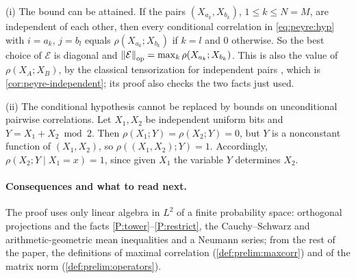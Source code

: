 \begin{remark}\label{rem:peyre:sharp}
(i) The bound can be attained. If the pairs $(X_{a_k},X_{b_k})$,
$1\le k\le N=M$, are independent of each other, then every conditional
correlation in \eqref{eq:peyre:hyp} with $i=a_k$, $j=b_l$ equals
$\rho(X_{a_k};X_{b_k})$ if $k=l$ and $0$ otherwise. So the best choice of
$\mathcal E$ is diagonal and $\left\|\mathcal E\right\|_{\mathrm{op}}=\max_k\rho(X_{a_k};X_{b_k})$.
This is also the value of $\rho(X_A;X_B)$, by the classical tensorization for
independent pairs \cite[Theorem~1.1.19]{Peyre}, which is
\cref{cor:peyre-independent}; its proof also checks the two facts just used.

(ii) The conditional hypothesis cannot be replaced by bounds on unconditional
pairwise correlations. Let $X_1,X_2$ be independent uniform bits and
$Y=X_1+X_2\bmod2$. Then $\rho(X_1;Y)=\rho(X_2;Y)=0$, but $Y$ is a nonconstant
function of $(X_1,X_2)$, so $\rho((X_1,X_2);Y)=1$. Accordingly,
$\rho(X_2;Y\mid X_1=x)=1$, since given $X_1$ the variable $Y$ determines
$X_2$.
\end{remark}

\paragraph{Consequences and what to read next.}
The proof uses only linear algebra in $L^2$ of a finite probability space: orthogonal
projections and the facts \ref{P:tower}--\ref{P:restrict}, the
Cauchy--Schwarz and arithmetic-geometric mean inequalities and a Neumann
series; from the rest of the paper, the definitions of maximal correlation
(\cref{def:prelim:maxcorr}) and of the matrix norm
(\cref{def:prelim:operators}).
